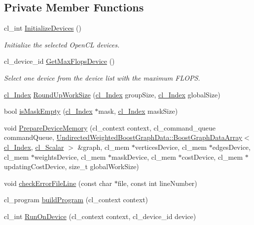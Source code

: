 \subsection*{Private Member Functions}
\begin{DoxyCompactItemize}
\item 
cl\+\_\+int \hyperlink{class_dijkstra_1_1_dijkstra_c_l_a5e54d3932bccd4bf984df2098b125898}{Initialize\+Devices} ()
\begin{DoxyCompactList}\small\item\em Initialize the selected Open\+C\+L devices. \end{DoxyCompactList}\item 
cl\+\_\+device\+\_\+id \hyperlink{class_dijkstra_1_1_dijkstra_c_l_a6bfc38ebf6e1d303f908ac254f94df41}{Get\+Max\+Flops\+Device} ()
\begin{DoxyCompactList}\small\item\em Select one device from the device list with the maximum F\+L\+O\+P\+S. \end{DoxyCompactList}\item 
\hyperlink{class_dijkstra_1_1_dijkstra_c_l_aab92585b062690f0835f154dc28f8c04}{cl\+\_\+\+Index} \hyperlink{class_dijkstra_1_1_dijkstra_c_l_afdc37522923aee23fe315bcf8d992275}{Round\+Up\+Work\+Size} (\hyperlink{class_dijkstra_1_1_dijkstra_c_l_aab92585b062690f0835f154dc28f8c04}{cl\+\_\+\+Index} group\+Size, \hyperlink{class_dijkstra_1_1_dijkstra_c_l_aab92585b062690f0835f154dc28f8c04}{cl\+\_\+\+Index} global\+Size)
\item 
bool \hyperlink{class_dijkstra_1_1_dijkstra_c_l_a2d58915ccd8fa4967947598a4a588d40}{is\+Mask\+Empty} (\hyperlink{class_dijkstra_1_1_dijkstra_c_l_aab92585b062690f0835f154dc28f8c04}{cl\+\_\+\+Index} $\ast$mask, \hyperlink{class_dijkstra_1_1_dijkstra_c_l_aab92585b062690f0835f154dc28f8c04}{cl\+\_\+\+Index} mask\+Size)
\item 
void \hyperlink{class_dijkstra_1_1_dijkstra_c_l_acd0c8413f67d7bc40994585c59534400}{Prepare\+Device\+Memory} (cl\+\_\+context context, cl\+\_\+command\+\_\+queue command\+Queue, \hyperlink{struct_undirected_weighted_graph_1_1_graph_array}{Undirected\+Weighted\+BoostGraphData\+::\+BoostGraphData\+Array}$<$ \hyperlink{class_dijkstra_1_1_dijkstra_c_l_aab92585b062690f0835f154dc28f8c04}{cl\+\_\+\+Index}, \hyperlink{class_dijkstra_1_1_dijkstra_c_l_a5dc96724577a49ee14d4c2e1df3c0579}{cl\+\_\+\+Scalar} $>$ \&graph, cl\+\_\+mem $\ast$vertices\+Device, cl\+\_\+mem $\ast$edges\+Device, cl\+\_\+mem $\ast$weights\+Device, cl\+\_\+mem $\ast$mask\+Device, cl\+\_\+mem $\ast$cost\+Device, cl\+\_\+mem $\ast$updating\+Cost\+Device, size\+\_\+t global\+Work\+Size)
\item 
void \hyperlink{class_dijkstra_1_1_dijkstra_c_l_a8fb0b75503b75bb345ed69f3eb67db0c}{check\+Error\+File\+Line} (const char $\ast$file, const int line\+Number)
\item 
cl\+\_\+program \hyperlink{class_dijkstra_1_1_dijkstra_c_l_adba3c2be1500db0f3be3da2933dff8f7}{build\+Program} (cl\+\_\+context context)
\item 
cl\+\_\+int \hyperlink{class_dijkstra_1_1_dijkstra_c_l_a441934a4066c0f99962c96aded098536}{Run\+On\+Device} (cl\+\_\+context context, cl\+\_\+device\+\_\+id device)
\end{DoxyCompactItemize}
